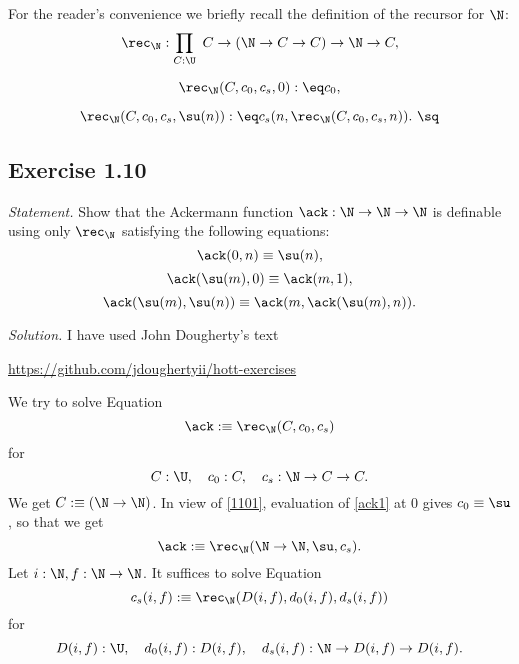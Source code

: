 \documentclass[12pt]{article}
\begin{document}
For the reader's convenience we briefly recall the definition of the recursor for $\N$:
$$
\rec_\N:\prod_{C:\U}\ C\to(\N\to C\to C)\to\N\to C,
$$

$$\rec_\N(C,c_0,c_s,0):\eq c_0,$$

$$\rec_\N(C,c_0,c_s,\su(n)):\eq c_s(n,\rec_\N(C,c_0,c_s,n)).\ \sq$$


\subsection{Exercise 1.10}

\emph{Statement.} Show that the Ackermann function $\ack:\N\to\N\to\N$ is definable using only $\rec_\N$ satisfying the following equations:
\begin{equation}\label{1101}
\ack(0,n)\equiv\su(n),
\end{equation}
\begin{equation}\label{1102}
\ack(\su(m),0)\equiv\ack(m,1),
\end{equation}
\begin{equation}\label{1103}
\ack(\su(m),\su(n))\equiv\ack(m,\ack(\su(m),n)).
\end{equation}

\nn\emph{Solution.} I have used John Dougherty's text 

\nn\href{https://github.com/jdoughertyii/hott-exercises}{https://github.com/jdoughertyii/hott-exercises}

We try to solve Equation 
\begin{equation}\label{ack1}
\ack:\equiv\rec_\N(C,c_0,c_s)
\end{equation}
for 
$$
C:\U,\quad c_0:C,\quad c_s:\N\to C\to C.
$$ 
We get $C:\equiv(\N\to\N)$. In view of \eqref{1101}, evaluation of \eqref{ack1} at 0 gives $c_0\equiv\su$, so that we get 
\begin{equation}\label{ack1b}
\ack:\equiv\rec_\N(\N\to\N,\su,c_s).
\end{equation}
Let $i:\N,f:\N\to\N$. It suffices to solve Equation 
\begin{equation}\label{ack2}
c_s(i,f):\equiv\rec_\N(D(i,f),d_0(i,f),d_s(i,f))
\end{equation}
for 
$$
D(i,f):\U,\quad d_0(i,f):D(i,f),\quad d_s(i,f):\N\to D(i,f)\to D(i,f).
$$ 
\end{document}
